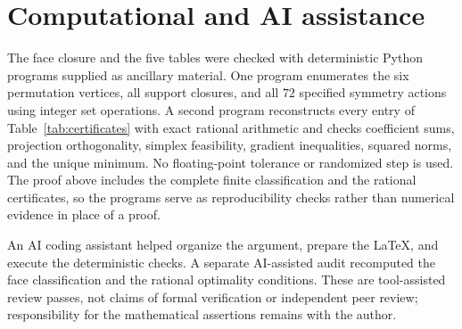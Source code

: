 \documentclass[11pt]{article}
\begin{document}
\section{Computational and AI assistance}

The face closure and the five tables were checked with deterministic Python
programs supplied as ancillary material.  One program enumerates the six
permutation vertices, all support closures, and all $72$ specified symmetry
actions using integer set operations.  A second program reconstructs every
entry of Table~\ref{tab:certificates} with exact rational arithmetic and
checks coefficient sums, projection orthogonality, simplex feasibility,
gradient inequalities, squared norms, and the unique minimum.  No
floating-point tolerance or randomized step is used.  The proof above
includes the complete finite classification and the rational certificates,
so the programs serve as reproducibility checks rather than numerical
evidence in place of a proof.

An AI coding assistant helped organize the argument, prepare the LaTeX, and
execute the deterministic checks.  A separate AI-assisted audit recomputed
the face classification and the rational optimality conditions.  These are
tool-assisted review passes, not claims of formal verification or independent
peer review; responsibility for the mathematical assertions remains with the
author.



\end{document}
